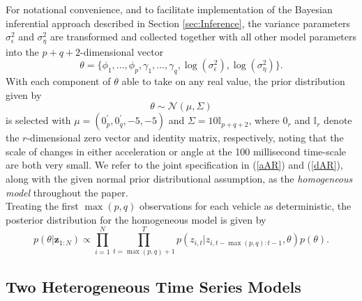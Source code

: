 \documentclass[12pt,a4paper]{article}\usepackage[]{graphicx}\usepackage[]{color}
\begin{document}
For notational convenience, and to facilitate implementation of the Bayesian inferential approach described in Section \ref{sec:Inference}, the variance parameters $\sigma^2_{\epsilon}$ and $\sigma^2_{\eta}$ are transformed and collected together with all other model parameters into the $p + q + 2$-dimensional vector
\begin{equation*}
\label{thetaVec}
\theta = \{\phi_{1}, \dots, \phi_{p}, \gamma_{1}, \dots, \gamma_{q}, \log(\sigma^{2}_{\epsilon}), \log(\sigma^{2}_{\eta})\}.
\end{equation*}
With each component of $\theta$ able to take on any real value, the prior distribution given by
\begin{equation}
\label{indPrior}
\theta \sim \mathcal{N}\left(\mu, \Sigma \right)
\end{equation}
is selected with $\mu=(0_p^{\prime},0_q^{\prime},-5, -5)$ and $\Sigma = 10 \mathbb{I}_{p+q+2}$, where $0_r$ and $\mathbb{I}_r$ denote the $r$-dimensional zero vector and identity matrix, respectively, noting that the scale of changes in either acceleration or angle at the 100 millisecond time-scale are both very small. We refer to the joint specification in (\ref{aAR}) and (\ref{dAR}), along with the given normal prior distributional assumption, as the \textit{homogeneous model} throughout the paper.
\\
Treating the first $\max(p, q)$ observations for each vehicle as deterministic, the posterior distribution for the homogeneous model is given by
\begin{equation}
\label{homogPost}
p(\theta | \textbf{z}_{1:N}) \propto \prod_{i=1}^N \prod_{t = \max(p, q) + 1}^T p(z_{i, t} | z_{i, t-\max(p, q):t-1}, \theta)p(\theta).
\end{equation}



\subsection{Two Heterogeneous Time Series Models}
\label{subsec:heterogeneous}
\end{document}
